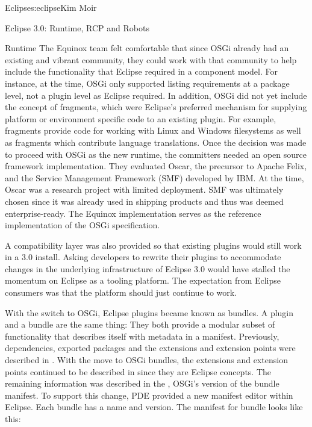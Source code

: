 \begin{aosachapter}{Eclipse}{s:eclipse}{Kim Moir}
\begin{aosasect1}{Eclipse 3.0: Runtime, RCP and Robots}
\begin{aosasect2}{Runtime}
The Equinox team felt comfortable that since OSGi already had an
existing and vibrant community, they could work with that community to
help include the functionality that Eclipse required in a component
model.  For instance, at the time, OSGi only supported listing
requirements at a package level, not a plugin level as Eclipse
required. In addition, OSGi did not yet include the concept of
fragments, which were Eclipse's preferred mechanism for supplying
platform or environment specific code to an existing plugin. For
example, fragments provide code for working with Linux and Windows
filesystems as well as fragments which contribute language
translations. Once the decision was made to proceed with OSGi as the
new runtime, the committers needed an open source framework
implementation. They evaluated Oscar, the precursor to Apache Felix,
and the Service Management Framework (SMF) developed by IBM\@. At the
time, Oscar was a research project with limited deployment.  SMF was
ultimately chosen since it was already used in shipping products and
thus was deemed enterprise-ready. The Equinox implementation serves as
the reference implementation of the OSGi specification.

A compatibility layer was also provided so that existing plugins
would still work in a 3.0 install. Asking developers to rewrite their
plugins to accommodate changes in the underlying infrastructure of
Eclipse 3.0 would have stalled the momentum on Eclipse as a tooling
platform. The expectation from Eclipse consumers was that the platform
should just continue to work.

With the switch to OSGi, Eclipse plugins became known as bundles. A
plugin and a bundle are the same thing: They both provide a modular
subset of functionality that describes itself with metadata in a
manifest.  Previously, dependencies, exported packages and the
extensions and extension points were described in .
With the move to OSGi bundles, the extensions and extension points
continued to be described in  since they are Eclipse
concepts. The remaining information was described in
the , OSGi's version of the bundle
manifest. To support this change, PDE provided a new manifest editor
within Eclipse.  Each bundle has a name and version. The manifest for
 bundle looks like this:


\end{aosasect2}
\end{aosasect1}
\end{aosachapter}
